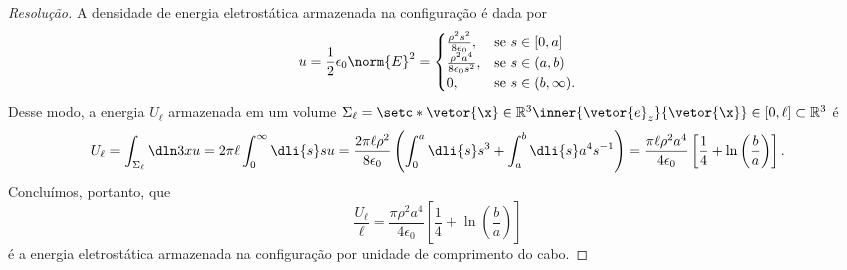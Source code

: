 \begin{proof}[Resolução]
    A densidade de energia eletrostática armazenada na configuração é dada por
    \begin{equation*}
        u = \frac12 \epsilon_0 \norm{E}^2 = \begin{cases}
            \frac{\rho^2 s^2}{8\epsilon_0}, & \text{se }s \in [0, a]\\
            \frac{\rho^2 a^4}{8 \epsilon_0 s^2}, &\text{se }s \in (a, b)\\
            0, &\text{se }s \in (b, \infty).
        \end{cases}
    \end{equation*}
    Desse modo, a energia \(U_{\ell}\) armazenada em um volume \(\Sigma_\ell = \setc*{\vetor{\x} \in \mathbb{R}^3}{\inner{\vetor{e}_z}{\vetor{\x}} \in [0, \ell]}\subset \mathbb{R}^3\) é
    \begin{equation*}
        U_{\ell} = \int_{\Sigma_\ell}\dln3x u = 2\pi \ell \int_{0}^\infty \dli{s} su = \frac{2\pi \ell \rho^2}{8 \epsilon_0}\left( \int_0^a \dli{s} s^3 + \int_a^b \dli{s} a^4s^{-1}\right) = \frac{\pi \ell \rho^2a^4}{4 \epsilon_0}\left[\frac{1}{4} + \ln\left(\frac{b}{a}\right)\right].
    \end{equation*}
    Concluímos, portanto, que
    \begin{equation*}
        \frac{U_\ell}{\ell} = \frac{\pi\rho^2a^4}{4 \epsilon_0}\left[\frac{1}{4} + \ln\left(\frac{b}{a}\right)\right]
    \end{equation*}
    é a energia eletrostática armazenada na configuração por unidade de comprimento do cabo.
\end{proof}
